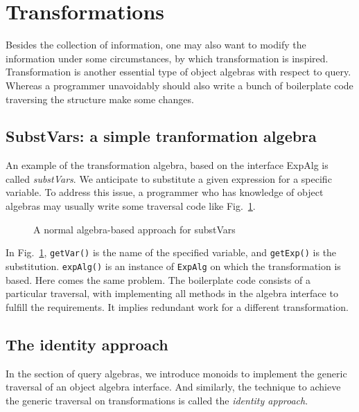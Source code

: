 \section{Transformations}\label{sec:transformations}
\label{retroimp}

Besides the collection of information, one may also want to modify the information under some circumstances, by which transformation is inspired. Transformation is another essential type of object algebras with respect to query. Whereas a programmer unavoidably should also write a bunch of boilerplate code traversing the structure make some changes.

\subsection{SubstVars: a simple tranformation algebra}\label{subsec:substvars}

An example of the transformation algebra, based on the interface ExpAlg is called \textit{substVars}. We anticipate to substitute a given expression for a specific variable. To address this issue, a programmer who has knowledge of object algebras may usually write some traversal code like Fig.~\ref{substvars_without_id}.

\begin{figure}[!htbp]
\vspace{-.1in}
\caption{A normal algebra-based approach for substVars}
\label{substvars_without_id}
\end{figure}

In Fig.~\ref{substvars_without_id}, \lstinline{getVar()} is the name of the specified variable, and \lstinline{getExp()} is the substitution. \lstinline{expAlg()} is an instance of \lstinline{ExpAlg} on which the transformation is based. Here comes the same problem. The boilerplate code consists of a particular traversal, with implementing all methods in the algebra interface to fulfill the requirements. It implies redundant work for a different transformation.

\subsection{The identity approach}\label{subsec:idapproach}

In the section of query algebras, we introduce monoids to implement the generic traversal of an object algebra interface. And similarly, the technique to achieve the generic traversal on transformations is called the \textit{identity approach}.

